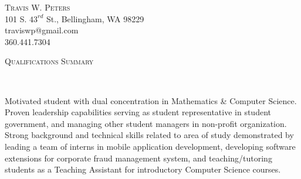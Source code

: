 \documentclass[9pt]{article}
\newenvironment{changemargin}[2]{%
  \begin{list}{}{%
    \setlength{\topsep}{0pt}%
    \setlength{\leftmargin}{#1}%
    \setlength{\rightmargin}{#2}%
    \setlength{\listparindent}{\parindent}%
    \setlength{\itemindent}{\parindent}%
    \setlength{\parsep}{\parskip}%
  }%
  \item[]}{\end{list}
}
\newcommand{\lineover}{
	\begin{changemargin}{-0.05in}{-0.05in}
		\vspace*{-8pt}
		\hrulefill \\
		\vspace*{-2pt}
	\end{changemargin}
}
\newcommand{\header}[1]{
	\begin{changemargin}{-0.5in}{-0.5in}
		\scshape{#1}\\
  		\lineover
	\end{changemargin}
}
\newcommand{\contact}[4]{
	\begin{changemargin}{-0.5in}{-0.5in}
		\begin{center}
			{\Large \scshape {#1}}\\ \smallskip
			{#2}\\ \smallskip 
			{#3}\\ \smallskip
			{#4}\smallskip
		\end{center}
	\end{changemargin}
}
\newenvironment{body} {
	\vspace*{-16pt}
	\begin{changemargin}{-0.20in}{-0.5in}
  }	
	{\end{changemargin}
}
\begin{document}
\contact{Travis W. Peters}{101 S. $43^{rd}$ St., Bellingham, WA 98229}{traviswp@gmail.com}{360.441.7304}








\header{Qualifications Summary}

\vspace{14pt}
\begin{body}
Motivated student with dual concentration in Mathematics \& Computer Science. Proven leadership capabilities serving as student representative in student
government, and managing other student managers in non-profit organization. Strong background and technical skills related to area of study demonstrated by
leading a team of interns in mobile application development, developing software extensions for corporate fraud management system, and teaching/tutoring
students as a Teaching Assistant for introductory Computer Science courses. 	

\end{body}

\smallskip

\end{document}
